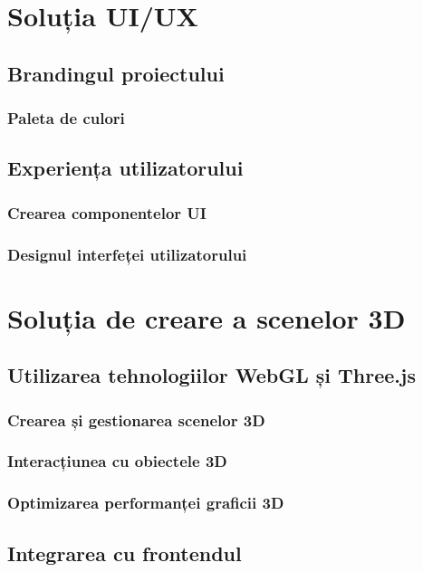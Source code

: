 \section{Soluția UI/UX}
\label{sub-sec:proj-ui-ux}
\subsection{Brandingul proiectului}
\subsubsection{Paleta de culori}

\subsection{Experiența utilizatorului}
\subsubsection{Crearea componentelor UI}
\subsubsection{Designul interfeței utilizatorului}

\section{Soluția de creare a scenelor 3D}
\label{sec:proj-3d}
\subsection{Utilizarea tehnologiilor WebGL și Three.js}
\subsubsection{Crearea și gestionarea scenelor 3D}
\subsubsection{Interacțiunea cu obiectele 3D}
\subsubsection{Optimizarea performanței graficii 3D}
\subsection{Integrarea cu frontendul}







